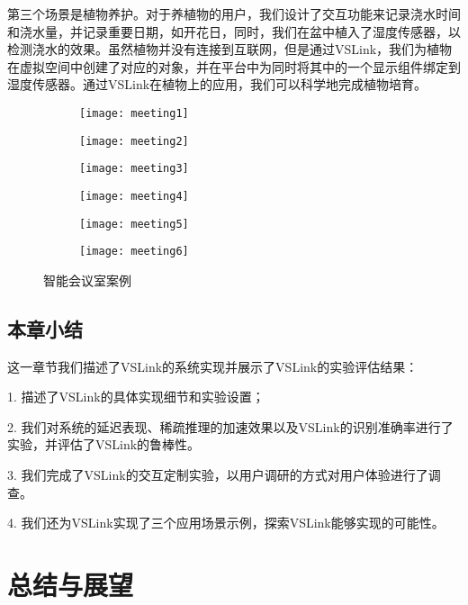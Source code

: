 第三个场景是植物养护。对于养植物的用户，我们设计了交互功能来记录浇水时间和浇水量，并记录重要日期，如开花日，同时，我们在盆中植入了湿度传感器，以检测浇水的效果。虽然植物并没有连接到互联网，但是通过VSLink，我们为植物在虚拟空间中创建了对应的对象，并在平台中为同时将其中的一个显示组件绑定到湿度传感器。通过VSLink在植物上的应用，我们可以科学地完成植物培育。

\begin{figure}[htb]
	\centering
	\begin{subfigure}{.48\linewidth}
		\texttt{[image: meeting1]}
		\caption{}
	\end{subfigure}
	\quad
	\begin{subfigure}{.48\linewidth}
		\texttt{[image: meeting2]}
		\caption{}
	\end{subfigure}
	\quad
	\begin{subfigure}{.48\linewidth}
		\texttt{[image: meeting3]}
		\caption{}
	\end{subfigure}
	\quad
	\begin{subfigure}{.48\linewidth}
		\texttt{[image: meeting4]}
		\caption{}
	\end{subfigure}
	\quad
	\begin{subfigure}{.48\linewidth}
		\texttt{[image: meeting5]}
		\caption{}
	\end{subfigure}
	\quad
	\begin{subfigure}{.48\linewidth}
		\texttt{[image: meeting6]}
		\caption{}
	\end{subfigure}
	\caption{智能会议室案例}\label{fig:meeting}
\end{figure}

\section{本章小结}
这一章节我们描述了VSLink的系统实现并展示了VSLink的实验评估结果：

1. 描述了VSLink的具体实现细节和实验设置；

2. 我们对系统的延迟表现、稀疏推理的加速效果以及VSLink的识别准确率进行了实验，并评估了VSLink的鲁棒性。

3. 我们完成了VSLink的交互定制实验，以用户调研的方式对用户体验进行了调查。

4. 我们还为VSLink实现了三个应用场景示例，探索VSLink能够实现的可能性。

\chapter{总结与展望}
\label{chap:sum}
